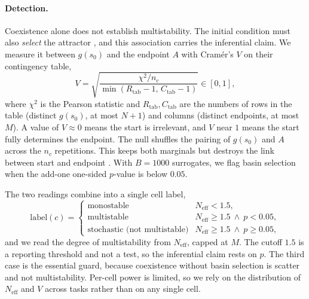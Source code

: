 \paragraph{Detection.}
Coexistence alone does not establish multistability. The initial condition must
also \emph{select} the attractor \citep{feudel2008complex, pisarchik2014control},
and this association carries the inferential claim. We measure it between
$g(s_0)$ and the endpoint $A$ with Cram\'er's $V$
\citep{cramer1946mathematical} on their contingency table,
\begin{equation}
  V = \sqrt{\frac{\chi^2 / n_c}{\min(R_{\mathrm{tab}} - 1,\, C_{\mathrm{tab}} - 1)}} \in [0, 1],
\end{equation}
where $\chi^2$ is the Pearson statistic and $R_{\mathrm{tab}}, C_{\mathrm{tab}}$
are the numbers of rows in the table (distinct $g(s_0)$, at most $N+1$) and columns
(distinct endpoints, at most $M$). A value of $V \approx 0$ means the start is
irrelevant, and $V$ near $1$ means the start fully determines the endpoint. The
null shuffles the pairing of $g(s_0)$ and $A$ across the $n_c$ repetitions. This
keeps both marginals but destroys the link between start and endpoint
\citep{theiler1992surrogate}. With $B = 1000$ surrogates, we flag basin selection
when the add-one one-sided $p$-value is below $0.05$.

The two readings combine into a single cell label,
\begin{equation}
  \text{label}(c) =
  \begin{cases}
    \text{monostable} & N_{\mathrm{eff}} < 1.5,\\[2pt]
    \text{multistable} & N_{\mathrm{eff}} \geq 1.5 \ \wedge\ p < 0.05,\\[2pt]
    \text{stochastic (not multistable)} & N_{\mathrm{eff}} \geq 1.5 \ \wedge\ p \geq 0.05,
  \end{cases}
\end{equation}
and we read the degree of multistability from $N_{\mathrm{eff}}$, capped at $M$.
The cutoff $1.5$ is a reporting threshold and not a test, so the inferential claim
rests on $p$. The third case is the essential guard, because coexistence without
basin selection is scatter and not multistability. Per-cell power is limited, so
we rely on the distribution of $N_{\mathrm{eff}}$ and $V$ across tasks rather than
on any single cell.

